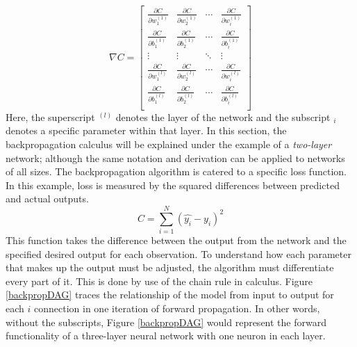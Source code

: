 \[
\nabla{C} =
\begin{bmatrix}
\frac{\partial{C}}{\partial{w_1^{(1)}}} & \frac{\partial{C}}{\partial{w_2^{(1)}}} & \cdots & 
\frac{\partial{C}}{\partial{w_i^{(1)}}} \\
\frac{\partial{C}}{\partial{b_1^{(1)}}} & \frac{\partial{C}}{\partial{b_2^{(1)}}} & \cdots & 
\frac{\partial{C}}{\partial{b_i^{(1)}}} \\
\vdots & \vdots & \ddots & \vdots \\
\frac{\partial{C}}{\partial{w_1^{(l)}}} & \frac{\partial{C}}{\partial{w_2^{(l)}}} & \cdots & 
\frac{\partial{C}}{\partial{w_i^{(l)}}} \\
\frac{\partial{C}}{\partial{b_1^{(l)}}} & \frac{\partial{C}}{\partial{b_2^{(l)}}} & \cdots & 
\frac{\partial{C}}{\partial{b_i^{(l)}}} \\
\end{bmatrix}
\] Here, the superscript \(^{(l)}\) denotes the layer of the network and
the subscript \(_i\) denotes a specific parameter within that
layer. In this section, the backpropagation calculus will be explained under the example of a \textit{two-layer} network; although the same notation and derivation can be applied to networks of all sizes.
The backpropagation algorithm is catered to a specific loss function. In
this example, loss is measured by the squared differences between predicted and actual outputs.
$$
C = \sum_{i=1}^N (\hat{y_i} - y_i)^2
$$
This function takes the difference between the output from the
network and the specified desired output for each observation. To
understand how each parameter that makes up the output must be adjusted,
the algorithm must differentiate every part of it. This is done by use
of the chain rule in calculus. Figure \ref{backpropDAG} traces the relationship of the model from input to output for each $i$ connection in one iteration of forward propagation.  In other words, without the subscripts, Figure \ref{backpropDAG} would represent the forward functionality of a three-layer neural network with one neuron in each layer.

